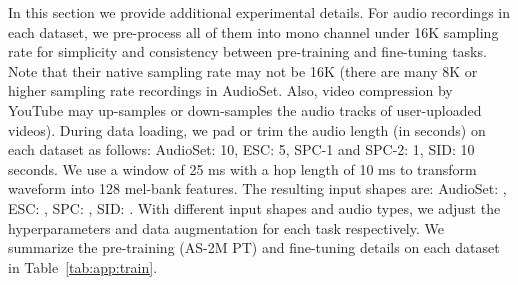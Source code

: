 \documentclass{article}
\begin{document}
In this section we provide additional experimental details.
For audio recordings in each dataset, we pre-process all of them into mono channel under 16K sampling rate for simplicity and consistency between pre-training and fine-tuning tasks. 
Note that their native sampling rate may not be 16K (there are many 8K or higher sampling rate recordings in AudioSet. Also, video compression by YouTube may up-samples or down-samples the audio tracks of user-uploaded videos).
During data loading, we pad or trim the audio length (in seconds) on each dataset as follows: AudioSet: 10, ESC: 5, SPC-1 and SPC-2: 1, SID: 10 seconds. 
We use a window of 25 ms with a hop length of 10 ms to transform waveform into 128 mel-bank features. 
The resulting input shapes are: AudioSet: , ESC: , SPC: , SID: . 
With different input shapes and audio types, we adjust the hyperparameters and data augmentation for each task respectively.
We summarize the pre-training (AS-2M PT) and fine-tuning details on each dataset in Table~\ref{tab:app:train}. 
\end{document}
